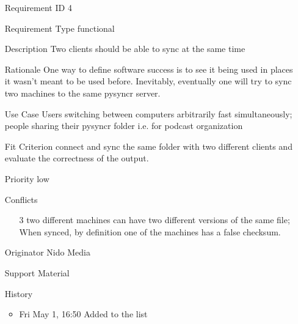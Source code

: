 \documentclass{article}
\begin{document}
\begin{itemize}
  \item[Requirement ID] 4
  \item[Requirement Type] functional
  \item[Description] Two clients should be able to sync at the same time
  \item[Rationale] One way to define software success is to see it being
  used in places it wasn't meant to be used before. Inevitably,
  eventually one will try to sync two machines to the same pysyncr
  server.
  \item[Use Case] Users switching between computers arbitrarily fast
  simultaneously; people sharing their pysyncr folder i.e. for podcast
  organization
  \item[Fit Criterion] connect and sync the same folder with two
  different clients and evaluate the correctness of the output.
  \item[Priority] low
  \item[Conflicts]
  \begin{itemize}
    \item[3] two different machines can have two different versions
    of the same file; When synced, by definition one of the machines
    has a false checksum.
  \end{itemize}
  \item[Originator] Nido Media 
  \item[Support Material] 
  \item[History] 
  \begin{itemize}
    \item Fri May 1, 16:50 Added to the list
  \end{itemize}
\end{itemize}
\end{document}
